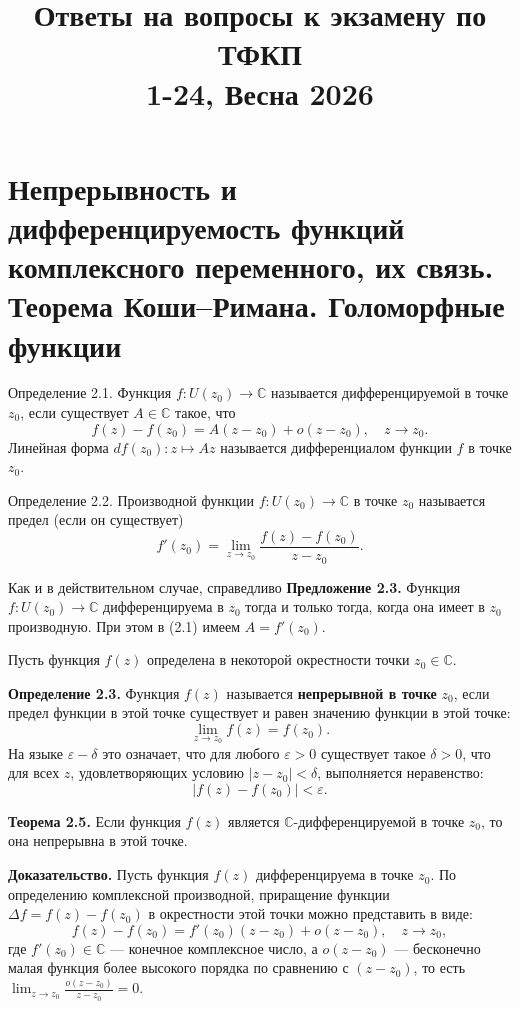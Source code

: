 \documentclass[12pt, a4paper]{article}
\title{\textbf{Ответы на вопросы к экзамену по ТФКП}\\\large 1-24, Весна 2026}
\author{}
\date{}
\theoremstyle{definition}
\theoremstyle{remark}
\begin{document}
	\maketitle
	\tableofcontents
	\newpage
	
\section{Непрерывность и дифференцируемость функций комплексного переменного, их связь. Теорема Коши–Римана. Голоморфные функции}

Определение 2.1. Функция $f : U(z_0) \to \mathbb{C}$ называется дифференцируемой в точке $z_0$, если существует $A \in \mathbb{C}$ такое, что
\begin{equation}
	f(z) - f(z_0) = A(z - z_0) + o(z - z_0), \quad z \to z_0.
\end{equation}
Линейная форма $df(z_0) : z \mapsto Az$ называется дифференциалом функции $f$ в точке $z_0$.

Определение 2.2. Производной функции $f : U(z_0) \to \mathbb{C}$ в точке $z_0$ называется предел (если он существует)
\begin{equation}
	f'(z_0) = \lim_{z \to z_0} \frac{f(z) - f(z_0)}{z - z_0}.
\end{equation}

Как и в действительном случае, справедливо
\textbf{Предложение 2.3.} Функция $f : U(z_0) \to \mathbb{C}$ дифференцируема в $z_0$ тогда и только тогда, когда она имеет в $z_0$ производную. При этом в (2.1) имеем $A = f'(z_0)$.

Пусть функция $f(z)$ определена в некоторой окрестности точки $z_0 \in \mathbb{C}$.

\textbf{Определение 2.3.} Функция $f(z)$ называется \textbf{непрерывной в точке} $z_0$, если предел функции в этой точке существует и равен значению функции в этой точке:
\[
\lim_{z \to z_0} f(z) = f(z_0).
\]
На языке $\varepsilon-\delta$ это означает, что для любого $\varepsilon > 0$ существует такое $\delta > 0$, что для всех $z$, удовлетворяющих условию $|z - z_0| < \delta$, выполняется неравенство:
\[
|f(z) - f(z_0)| < \varepsilon.
\]

\textbf{Теорема 2.5.} Если функция $f(z)$ является $\mathbb{C}$-дифференцируемой в точке $z_0$, то она непрерывна в этой точке.

\textbf{Доказательство.} Пусть функция $f(z)$ дифференцируема в точке $z_0$. По определению комплексной производной, приращение функции $\Delta f = f(z) - f(z_0)$ в окрестности этой точки можно представить в виде:
\[
f(z) - f(z_0) = f'(z_0)(z - z_0) + o(z - z_0), \quad z \to z_0,
\]
где $f'(z_0) \in \mathbb{C}$ --- конечное комплексное число, а $o(z - z_0)$ --- бесконечно малая функция более высокого порядка по сравнению с $(z - z_0)$, то есть $\lim_{z \to z_0} \frac{o(z - z_0)}{z - z_0} = 0$.
\end{document}
